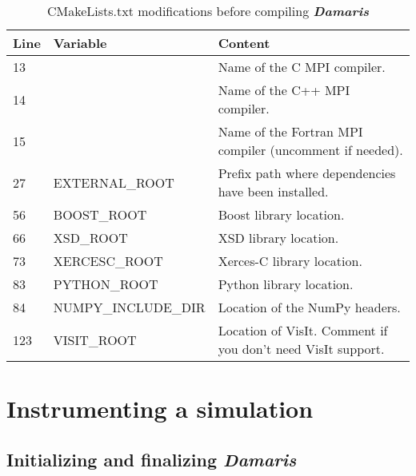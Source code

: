 \documentclass[11pt]{report}
\newcommand{\Damaris}{\emph{\textbf{Damaris}}}
\begin{document}
\begin{table}
\centering
\begin{tabular}{|l|l|l|}
	\hline
   Line & Variable & Content \\
   \hline
   \hline
   13 &  & Name of the C MPI compiler. \\
   14 &  & Name of the C++ MPI compiler. \\
   15 &  & Name of the Fortran MPI compiler (uncomment if needed). \\
   27 & EXTERNAL\_ROOT & Prefix path where dependencies have been installed. \\
   56 & BOOST\_ROOT & Boost library location. \\
   66 & XSD\_ROOT & XSD library location. \\
   73 & XERCESC\_ROOT & Xerces-C library location. \\
   83 & PYTHON\_ROOT & Python library location. \\
   84 & NUMPY\_INCLUDE\_DIR & Location of the NumPy headers. \\
   123 & VISIT\_ROOT & Location of VisIt. Comment if you don't need VisIt support. \\
   \hline
\end{tabular}\caption{CMakeLists.txt modifications before compiling \Damaris{}}\label{tab:cmake}
\end{table}



\chapter{Instrumenting a simulation}\label{Instrumenting}

\section{Initializing and finalizing \Damaris{}}
\end{document}
